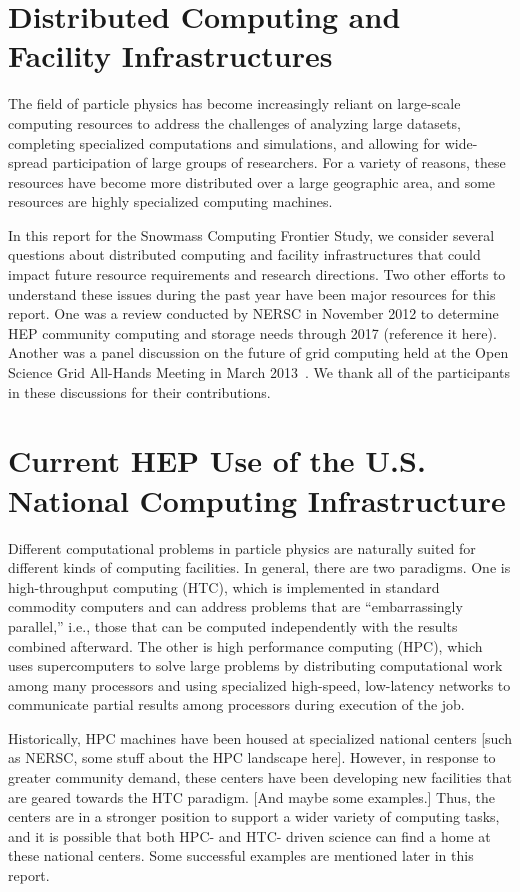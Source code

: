 \section{Distributed Computing and Facility Infrastructures}


The field of particle physics has become increasingly reliant on large-scale computing resources to address the challenges of analyzing large datasets, completing specialized computations and simulations, and allowing for wide-spread participation of large groups of researchers.  For a variety of reasons, these resources have become more distributed over a large geographic area, and some resources are highly specialized computing machines.

In this report for the Snowmass Computing Frontier Study, we consider several questions about distributed computing and facility infrastructures that could impact future resource requirements and research directions.  Two other efforts to understand these issues during the past year have been major resources for this report.  One was a review conducted by NERSC in November 2012 to determine HEP community computing and storage needs through 2017 (reference it here).  Another was a panel discussion on the future of grid computing held at the Open Science Grid All-Hands Meeting in March 2013~\cite{bib:OSGpanel}.  We thank all of the participants in these discussions for their contributions.

\section{Current HEP Use of the U.S. National Computing Infrastructure}

Different computational problems in particle physics are naturally suited for different kinds of computing facilities.  In general, there are two paradigms.  One is high-throughput computing (HTC), which is implemented in standard commodity computers and can address problems that are ``embarrassingly parallel,'' i.e., those that can be computed independently with the results combined afterward.  The other is high performance computing (HPC), which uses supercomputers to solve large problems by distributing computational work among many processors and using specialized high-speed, low-latency networks to communicate partial results among processors during execution of the job.

Historically, HPC machines have been housed at specialized national centers [such as NERSC, some stuff about the HPC landscape here].  However, in response to greater community demand, these centers have been developing new facilities that are geared towards the HTC paradigm.  [And maybe some examples.]  Thus, the centers are in a stronger position to support a wider variety of computing tasks, and it is possible that both HPC- and HTC- driven science can find a home at these national centers.  Some successful examples are mentioned later in this report.

